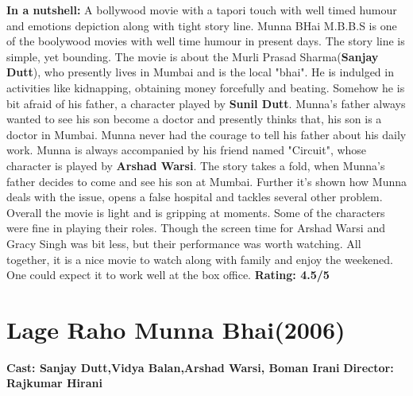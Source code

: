 \documentclass{article}
\begin{document}
\newline
\newline
\textbf{In a nutshell: } A bollywood movie with a tapori touch with well timed humour and emotions depiction along with tight story line.
\newline
Munna BHai M.B.B.S is one of the boolywood movies with well time humour in present days. The story line is simple, yet bounding. The movie is about the Murli Prasad Sharma(\textbf{Sanjay Dutt}), who presently lives in Mumbai and is the local "bhai". He is indulged in activities like kidnapping, obtaining money forcefully and beating. Somehow he is bit afraid of his father, a character played by \textbf{Sunil Dutt}. Munna's father always wanted to see his son become a doctor and presently thinks that, his son is a doctor in Mumbai. Munna never had the courage to tell his father about his daily work. Munna is always accompanied by his friend named "Circuit", whose character is played by \textbf{Arshad Warsi}. The story takes a fold, when Munna's father decides to come and see his son at Mumbai. Further it's shown how Munna deals with the issue, opens a false hospital and tackles several other problem. \newline
Overall the movie is light and is gripping at moments. Some of the characters were fine in playing their roles. Though the screen time for Arshad Warsi and Gracy Singh was bit less, but their performance was worth watching. All together, it is a nice movie to watch along with family and enjoy the weekened. One could expect it to work well at the box office.
\newline
\textbf{Rating: 4.5/5}


\section{Lage Raho Munna Bhai(2006)}

\textbf{Cast: Sanjay Dutt,Vidya Balan,Arshad Warsi, Boman Irani}
\textbf{Director: Rajkumar Hirani }  
\end{document}
